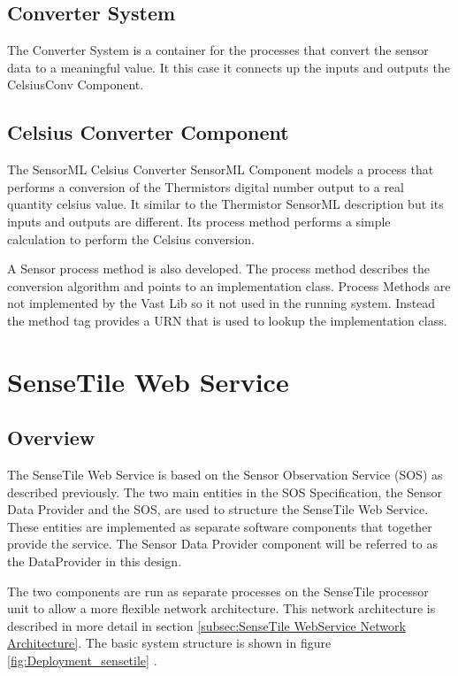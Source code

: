\documentclass[]{final_report}
\begin{document}
\subsection{Converter System}
The Converter System is a container for the processes that convert the sensor data to a meaningful value. It this case it connects up the inputs and outputs the CelsiusConv Component. 
\subsection{Celsius Converter Component}

The SensorML Celsius Converter SensorML Component  models a process that performs a conversion of the Thermistors digital number output to a real quantity celsius value. It similar to the Thermistor SensorML description but its inputs and outputs are different. Its process method performs a simple calculation to perform the Celsius conversion.

A Sensor process method is also developed. The process method describes the conversion algorithm and points to an implementation class. Process Methods are not implemented by the Vast Lib so it not used in the running system. Instead the method tag provides a URN that is used to lookup the implementation class.

\section{SenseTile Web Service}
\subsection{Overview}

The SenseTile Web Service is based on the Sensor Observation Service (SOS) as described previously. The two main entities in the SOS Specification, the Sensor Data Provider and the SOS,  are used to structure the SenseTile Web Service. These entities are implemented as separate software components that together provide the service. The Sensor Data Provider component will be referred to as the DataProvider in this design.

The two components are run as separate processes on the SenseTile processor unit to allow a more flexible network architecture.  This network architecture is described in more detail in section \ref{subsec:SenseTile WebService Network Architecture}. The basic system structure is shown in figure \ref {fig:Deployment_sensetile} .
\end{document}
